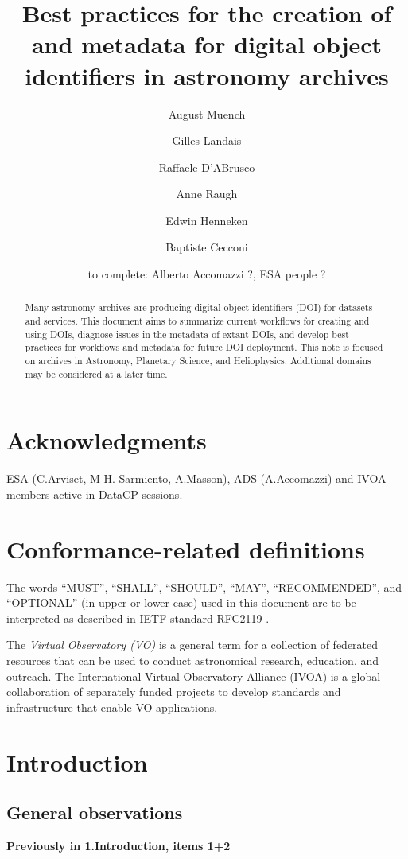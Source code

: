\documentclass[11pt,a4paper]{ivoa}
\title{Best practices for the creation of and metadata for digital object identifiers in astronomy archives}
\author[https://orcid.org/0000-0003-0666-6367]{August Muench}
\author[https://orcid.org/0000-0003-4868-5873]{Gilles Landais}
\author[https://orcid.org/0000-0003-3073-0605]{Raffaele D'ABrusco}
\author[https://orcid.org/0000-0002-8300-9443]{Anne Raugh}
\author[]{Edwin Henneken}
\author[https://orcid.org/0000-0001-7915-5571]{Baptiste Cecconi}
\author[]{to complete: Alberto Accomazzi ?, ESA people ?}
\begin{document}

\begin{abstract}
Many astronomy archives are producing digital object identifiers (DOI) for datasets and services.
This document aims to summarize current workflows for creating and using DOIs, 
diagnose issues in the metadata of extant DOIs, 
and develop best practices for workflows and metadata for future DOI deployment.
This note is focused on archives in Astronomy, Planetary Science, and Heliophysics. 
Additional domains may be considered at a later time.
\end{abstract}


\section*{Acknowledgments}

ESA (C.Arviset, M-H. Sarmiento, A.Masson), ADS (A.Accomazzi) and IVOA members active in DataCP sessions.

\section*{Conformance-related definitions}

The words ``MUST'', ``SHALL'', ``SHOULD'', ``MAY'', ``RECOMMENDED'', and
``OPTIONAL'' (in upper or lower case) used in this document are to be
interpreted as described in IETF standard RFC2119 \citep{std:RFC2119}.

The \emph{Virtual Observatory (VO)} is a general term for a collection of federated resources that can be used to conduct astronomical research, education, and outreach.
The \href{https://www.ivoa.net}{International Virtual Observatory Alliance (IVOA)} is a global collaboration of separately funded projects to develop standards and infrastructure that enable VO applications.


\section{Introduction}
\label{sec:intro}


\subsection{General observations} 
\textbf{\color{red} Previously in 1.Introduction, items 1+2}
\end{document}
